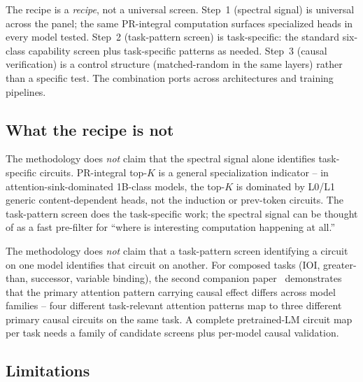 \documentclass[11pt]{article}
\begin{document}
The recipe is a \emph{recipe}, not a universal screen. Step~1 (spectral signal) is universal across the panel; the same PR-integral computation surfaces specialized heads in every model tested. Step~2 (task-pattern screen) is task-specific: the standard six-class capability screen plus task-specific patterns as needed. Step~3 (causal verification) is a control structure (matched-random in the same layers) rather than a specific test. The combination ports across architectures and training pipelines.

\subsection{What the recipe is not}

The methodology does \emph{not} claim that the spectral signal alone identifies task-specific circuits. PR-integral top-$K$ is a general specialization indicator -- in attention-sink-dominated 1B-class models, the top-$K$ is dominated by L0/L1 generic content-dependent heads, not the induction or prev-token circuits. The task-pattern screen does the task-specific work; the spectral signal can be thought of as a fast pre-filter for ``where is interesting computation happening at all.''

The methodology does \emph{not} claim that a task-pattern screen identifying a circuit on one model identifies that circuit on another. For composed tasks (IOI, greater-than, successor, variable binding), the second companion paper~\citep{paper3_circuits} demonstrates that the primary attention pattern carrying causal effect differs across model families -- four different task-relevant attention patterns map to three different primary causal circuits on the same task. A complete pretrained-LM circuit map per task needs a family of candidate screens plus per-model causal validation.

\subsection{Limitations}
\end{document}
